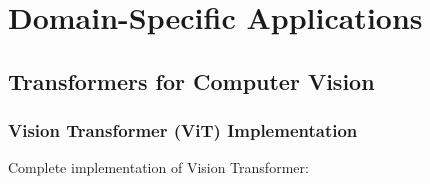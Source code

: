 
\section{Domain-Specific Applications}

\subsection{Transformers for Computer Vision}

\subsubsection{Vision Transformer (ViT) Implementation}

Complete implementation of Vision Transformer:

